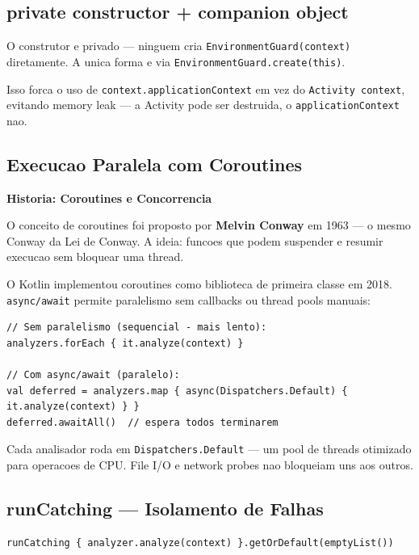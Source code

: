 \documentclass[12pt,a4paper]{article}
\begin{document}
\subsection{private constructor + companion object}

O construtor e privado --- ninguem cria \texttt{EnvironmentGuard(context)} diretamente.
A unica forma e via \texttt{EnvironmentGuard.create(this)}.

Isso forca o uso de \texttt{context.applicationContext} em vez do
\texttt{Activity context}, evitando memory leak --- a Activity pode ser destruida,
o \texttt{applicationContext} nao.

\subsection{Execucao Paralela com Coroutines}

\begin{historybox}
\textbf{Historia: Coroutines e Concorrencia}

O conceito de coroutines foi proposto por \textbf{Melvin Conway} em 1963 --- o mesmo
Conway da Lei de Conway. A ideia: funcoes que podem suspender e resumir execucao
sem bloquear uma thread.

O Kotlin implementou coroutines como biblioteca de primeira classe em 2018.
\texttt{async/await} permite paralelismo sem callbacks ou thread pools manuais:

\begin{lstlisting}
// Sem paralelismo (sequencial - mais lento):
analyzers.forEach { it.analyze(context) }

// Com async/await (paralelo):
val deferred = analyzers.map { async(Dispatchers.Default) { it.analyze(context) } }
deferred.awaitAll()  // espera todos terminarem
\end{lstlisting}

Cada analisador roda em \texttt{Dispatchers.Default} --- um pool de threads
otimizado para operacoes de CPU. File I/O e network probes nao bloqueiam uns aos outros.
\end{historybox}

\subsection{runCatching --- Isolamento de Falhas}

\begin{lstlisting}
runCatching { analyzer.analyze(context) }.getOrDefault(emptyList())
\end{lstlisting}
\end{document}
